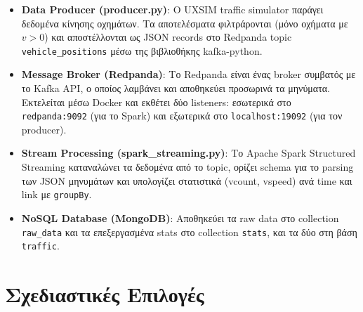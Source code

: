 \documentclass[11pt,a4paper]{article}
\begin{document}
\begin{itemize}
    \item \textbf{\textlatin{Data Producer} (\textlatin{producer.py})}: Ο \textlatin{UXSIM traffic simulator} παράγει δεδομένα κίνησης οχημάτων. Τα αποτελέσματα φιλτράρονται (μόνο οχήματα με $v > 0$) και αποστέλλονται ως \textlatin{JSON records} στο \textlatin{Redpanda topic} \texttt{\textlatin{vehicle\_positions}} μέσω της βιβλιοθήκης \textlatin{kafka-python}.

    \item \textbf{\textlatin{Message Broker} (\textlatin{Redpanda})}: Το \textlatin{Redpanda} είναι ένας \textlatin{broker} συμβατός με το \textlatin{Kafka API}, ο οποίος λαμβάνει και αποθηκεύει προσωρινά τα μηνύματα. Εκτελείται μέσω \textlatin{Docker} και εκθέτει δύο \textlatin{listeners}: εσωτερικά στο \texttt{\textlatin{redpanda:9092}} (για το \textlatin{Spark}) και εξωτερικά στο \texttt{\textlatin{localhost:19092}} (για τον \textlatin{producer}).

    \item \textbf{\textlatin{Stream Processing} (\textlatin{spark\_streaming.py})}: Το \textlatin{Apache Spark Structured Streaming} \mbox{καταναλώνει} τα δεδομένα από το \textlatin{topic}, ορίζει \textlatin{schema} για το \textlatin{parsing} των \textlatin{JSON} μηνυμάτων και υπολογίζει \mbox{στατιστικά} (\textlatin{vcount}, \textlatin{vspeed}) ανά \textlatin{time} και \textlatin{link} με \texttt{\textlatin{groupBy}}.

    \item \textbf{\textlatin{NoSQL Database} (\textlatin{MongoDB})}: Αποθηκεύει τα \textlatin{raw data} στο \textlatin{collection} \texttt{\textlatin{raw\_data}} και τα επεξεργασμένα \textlatin{stats} στο \textlatin{collection} \texttt{\textlatin{stats}}, και τα δύο στη βάση \texttt{\textlatin{traffic}}.
\end{itemize}

\section{Σχεδιαστικές Επιλογές}
\end{document}
